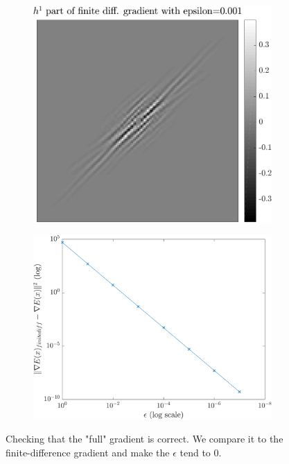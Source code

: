 \begin{figure}[!ht]
\begin{subfigure}[b]{0.30\textwidth}
\includegraphics[width=\textwidth]{figures/verif_gradient/finite-diff.pdf}
\end{subfigure}
\begin{subfigure}[b]{0.35\textwidth}\centering
\includegraphics[width=\textwidth]{figures/verif_gradient/finite-diff-vs-grad.pdf}
\end{subfigure}
\caption{Checking that the "full" gradient is correct. We compare it to the finite-difference gradient and make the $\epsilon$ tend to 0.} \label{fig_verif_gradient}
\end{figure}

